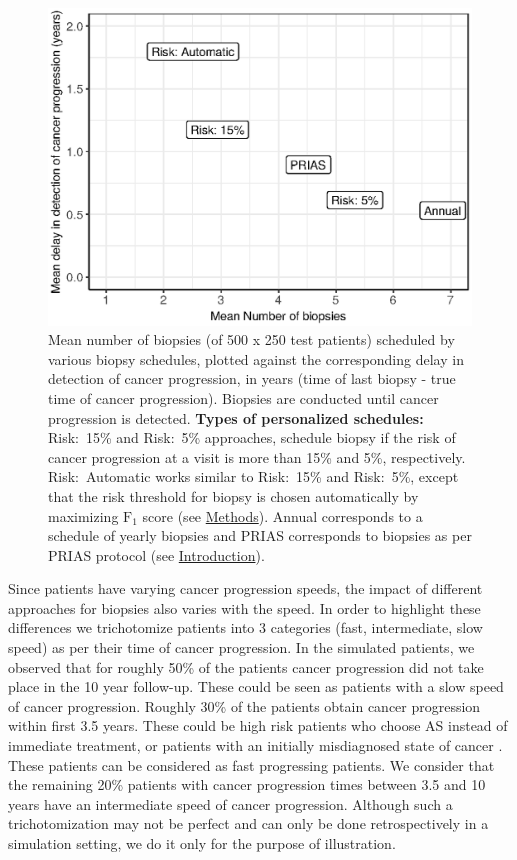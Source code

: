 \begin{figure}[!htb]
\captionsetup{justification=justified}
\centerline{\includegraphics[width=\columnwidth]{images/mean_nb_offset.eps}}
\caption{Mean number of biopsies (of 500 x 250 test patients) scheduled by various biopsy schedules, plotted against the corresponding delay in detection of cancer progression, in years (time of last biopsy - true time of cancer progression). Biopsies are conducted until cancer progression is detected. \textbf{Types of personalized schedules:} Risk:~15\% and Risk:~5\% approaches, schedule biopsy if the risk of cancer progression at a visit is more than 15\% and 5\%, respectively. Risk:~Automatic works similar to Risk:~15\% and Risk:~5\%, except that the risk threshold for biopsy is chosen automatically by maximizing $\mbox{F}_1$ score (see \hyperref[sec:methods]{Methods}). Annual corresponds to a schedule of yearly biopsies and PRIAS corresponds to biopsies as per PRIAS protocol (see \hyperref[sec:introduction]{Introduction}).}
\label{fig:mean_nb_offset}
\end{figure}

Since patients have varying cancer progression speeds, the impact of different approaches for biopsies also varies with the speed. In order to highlight these differences we trichotomize patients into 3 categories (fast, intermediate, slow speed) as per their time of cancer progression. In the simulated patients, we observed that for roughly 50\% of the patients cancer progression did not take place in the 10 year follow-up. These could be seen as patients with a slow speed of cancer progression. Roughly 30\% of the patients obtain cancer progression within first 3.5 years. These could be high risk patients who choose AS instead of immediate treatment, or patients with an initially misdiagnosed state of cancer \cite{cooperberg2011outcomes}. These patients can be considered as fast progressing patients. We consider that the remaining 20\% patients with cancer progression times between 3.5 and 10 years have an intermediate speed of cancer progression. Although such a trichotomization may not be perfect and can only be done retrospectively in a simulation setting, we do it only for the purpose of illustration.

